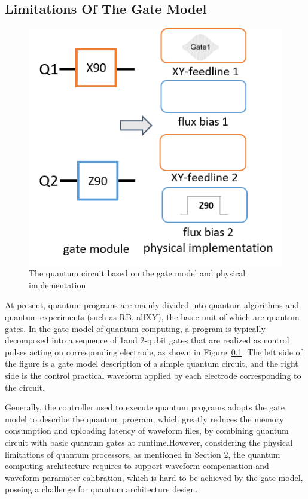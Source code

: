 \subsection{Limitations Of The Gate Model}
\begin{figure}[ht]
  \centering
  \includegraphics[width=\linewidth]{figure/2_1}
  \caption{The quantum circuit based on the gate model and physical implementation}
  \label{img2_1}
\end{figure}
At present, quantum programs are mainly divided into quantum algorithms and quantum experiments 
(such as RB, allXY), the basic unit of which are quantum gates. In the gate model of quantum computing, 
a program is typically decomposed into a sequence of 1and 2-qubit gates that are realized as control 
pulses acting on corresponding electrode, as shown in Figure~\ref{}. The left side of the figure is a gate model
description of a simple quantum circuit, and the right side is the control practical waveform applied by each 
electrode corresponding to the circuit.

Generally, the controller used to execute quantum programs adopts the gate model to describe 
the quantum program, which greatly reduces the memory consumption and uploading latency of waveform files, 
by combining quantum circuit with basic quantum gates at runtime.However, considering the physical limitations of quantum processors, 
as mentioned in Section 2, the quantum computing architecture requires to support waveform compensation and waveform paramater calibration, 
which is hard to be achieved by the gate model, poseing a challenge for quantum architecture design.

